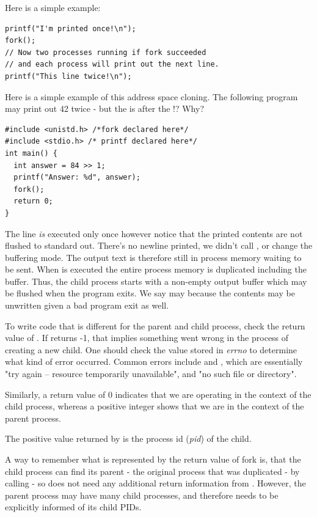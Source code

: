 Here is a simple example:

\begin{verbatim}
printf("I'm printed once!\n");
fork();
// Now two processes running if fork succeeded
// and each process will print out the next line.
printf("This line twice!\n");
\end{verbatim}

Here is a simple example of this address space cloning.
The following program may print out 42 twice - but the  is after the !? Why?

\begin{verbatim}
#include <unistd.h> /*fork declared here*/
#include <stdio.h> /* printf declared here*/
int main() {
  int answer = 84 >> 1;
  printf("Answer: %d", answer);
  fork();
  return 0;
}
\end{verbatim}

The  line \emph{is} executed only once however notice that the printed contents are not flushed to standard out.
There's no newline printed, we didn't call , or change the buffering mode.
The output text is therefore still in process memory waiting to be sent.
When  is executed the entire process memory is duplicated including the buffer.
Thus, the child process starts with a non-empty output buffer which may be flushed when the program exits.
We say may because the contents may be unwritten given a bad program exit as well.

To write code that is different for the parent and child process, check the return value of .
If  returns -1, that implies something went wrong in the process of creating a new child.
One should check the value stored in \emph{errno} to determine what kind of error occurred.
Common errors include  and , which are essentially "try again -- resource temporarily unavailable", and "no such file or directory".

Similarly, a return value of 0 indicates that we are operating in the context of the child process, whereas a positive integer shows that we are in the context of the parent process.

The positive value returned by  is the process id (\emph{pid}) of the child.

A way to remember what is represented by the return value of fork is, that the child process can find its parent - the original process that was duplicated - by calling  - so does not need any additional return information from . However, the parent process may have many child processes, and therefore needs to be explicitly informed of its child PIDs.

